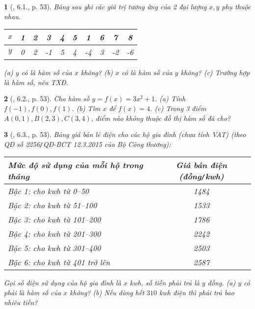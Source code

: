 \documentclass{article}
\newtheorem{baitoan}{}
\begin{document}
\begin{baitoan}[\cite{Binh_boi_duong_Toan_9_tap_1}, 6.1., p. 53]
	Bảng sau ghi các giá trị tương ứng của 2 đại lượng $x,y$ phụ thuộc nhau.
	\begin{table}[H]
		\centering
		\begin{tabular}{|c|c|c|c|c|c|c|c|c|c|}
			\hline
			$x$ & 1 & 2 & 3 & 4 & 5 & 1 & 6 & 7 & 8 \\
			\hline
			$y$ & 0 & 2 & -1 & 5 & 4 & -4 & 3 & -2 & -6 \\
			\hline
		\end{tabular}
	\end{table}
	\noindent(a) $y$ có là hàm số của $x$ không? (b) $x$ có là hàm số của $y$ không? (c) Trường hợp là hàm số, nêu {\rm TXĐ}.
\end{baitoan}

\begin{baitoan}[\cite{Binh_boi_duong_Toan_9_tap_1}, 6.2., p. 53]
	Cho hàm số $y = f(x) = 3x^2 + 1$. (a) Tính $f(-1),f(0),f(1)$. (b) Tìm $x$ để $f(x) = 4$. (c) Trong 3 điểm $A(0,1),B(2,3),C(3,4)$, điểm nào không thuộc đồ thị hàm số đã cho?
\end{baitoan}

\begin{baitoan}[\cite{Binh_boi_duong_Toan_9_tap_1}, 6.3., p. 53]
	Bảng giá bán lẻ điện cho các hộ gia đình (chưa tính {\rm VAT}) (theo QĐ số 2256{\tt/}QĐ-BCT 12.3.2015 của Bộ Công thương):
	\begin{table}[H]
		\centering
		\begin{tabular}{|l|c|}
			\hline
			Mức độ sử dụng của mỗi hộ trong tháng & Giá bán điện (đồng{\tt/}kwh) \\
			\hline
			Bậc 1: cho kwh từ 0--50 & 1484 \\
			\hline
			Bậc 2: cho kwh từ 51--100 & 1533 \\
			\hline
			Bậc 3: cho kwh từ 101--200 & 1786 \\
			\hline
			Bậc 4: cho kwh từ 201--300 & 2242 \\
			\hline
			Bậc 5: cho kwh từ 301--400 & 2503 \\
			\hline
			Bậc 6: cho kwh từ 401 trở lên & 2587 \\
			\hline
		\end{tabular}
	\end{table}
	\noindent Gọi số điện sử dụng của hộ gia đình là $x$ {\rm kwh}, số tiền phải trả là $y$ đồng. (a) $y$ có phải là hàm số của $x$ không? (b) Nếu dùng hết $310$ {\rm kwh} điện thì phải trả bao nhiêu tiền?
\end{baitoan}
\end{document}
